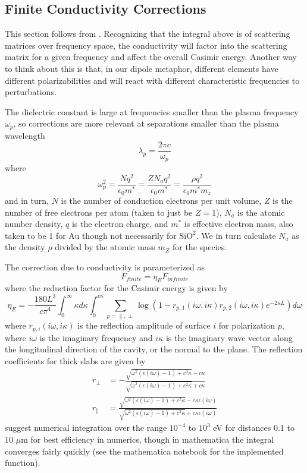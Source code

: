 \documentclass[11pt,traditabstract]{article}
\begin{document}
\subsection{Finite Conductivity Corrections}
This section follows from \citet{Lambrecht} \citep[see also][]{BeyondPFA}. Recognizing that the integral above is of scattering matrices over frequency space, the conductivity will factor into the scattering matrix for a given frequency and affect the overall Casimir energy. Another way to think about this is that, in our dipole metaphor, different elements have different polarizabilities and will react with different characteristic frequencies to perturbations.

The dielectric constant is large at frequencies smaller than the plasma frequency $\omega_p$, so corrections are more relevant at separations smaller than the plasma wavelength
$$
\lambda_p=\frac{2\pi c}{\omega_p}
$$
where
$$
\omega_p^2=\frac{Nq^2}{\epsilon_0m^*}=\frac{ZN_aq^2}{\epsilon_0m^*}=\frac{\rho q^2}{\epsilon_0m^*m_z}
$$
and in turn, $N$ is the number of conduction electrons per unit volume, $Z$ is the number of free electrons per atom (taken to just be $Z=1$), $N_a$ is the atomic number density, $q$ is the electron charge, and $m^*$ is effective electron mass, also taken to be 1 for Au though not necessarily for $\mathrm{SiO^2}$. We in turn calculate $N_a$ as the density $\rho$ divided by the atomic mass $m_Z$ for the species.

The correction due to conductivity is parameterized as
$$
F_{finite}=\eta_{E}F_{infinite}
$$
where the reduction factor for the Casimir energy is given by \citep{Lambrecht}
\begin{equation}
\eta_E=-\frac{180L^3}{c\pi^4}\int^{\infty}_{0}\kappa d\kappa\int^{c\kappa}_0\sum_{p=\parallel,\perp}\log{\left(1-r_{p,1}(i\omega,i\kappa)r_{p,2}(i\omega,i\kappa)e^{-2\kappa L}\right)}d\omega
\end{equation}
where $r_{p,i}(i\omega,i\kappa)$ is the reflection amplitude of surface $i$ for polarization $p$, where $i\omega$ is the imaginary frequency and $i\kappa$ is the imaginary wave vector along the longitudinal direction of the cavity, or the normal to the plane. The reflection coefficients for thick slabs are given by
\begin{align}
r_{\perp}&=-\frac{\sqrt{\omega^2(\epsilon(i\omega)-1)+c^2\kappa}-c\kappa}{\sqrt{\omega^2(\epsilon(i\omega)-1)+c^2\kappa}+c\kappa} \\
r_{\parallel}&=\frac{\sqrt{\omega^2(\epsilon(i\omega)-1)+c^2\kappa}-c\kappa\epsilon(i\omega)}{\sqrt{\omega^2(\epsilon(i\omega)-1)+c^2\kappa}+c\kappa\epsilon(i\omega)}
\end{align}
\citet{Lambrecht} suggest numerical integration over the range $10^{-4}$ to $10^{3}$ eV for distances 0.1 to 10 $\mu$m for best efficiency in numerics, though in mathematica the integral converges fairly quickly (see the mathematica notebook for the implemented function).
\end{document}

